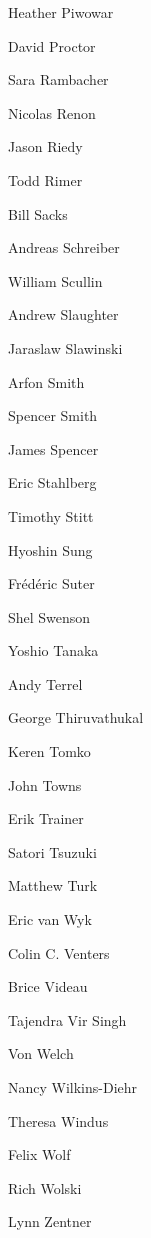 \documentclass[11pt, oneside]{amsart}
\begin{document}
\begin{multicols}{3}
Heather Piwowar

David Proctor

Sara Rambacher

Nicolas Renon

Jason Riedy

Todd Rimer

Bill Sacks

Andreas Schreiber

William Scullin

Andrew Slaughter

Jaraslaw Slawinski

Arfon Smith

Spencer Smith

James Spencer

Eric Stahlberg

Timothy Stitt

Hyoshin Sung

Fr\'{e}d\'{e}ric Suter

Shel Swenson

Yoshio Tanaka

Andy Terrel

George  Thiruvathukal

Keren Tomko

John Towns

Erik Trainer

Satori Tsuzuki

Matthew Turk

Eric van Wyk

Colin C. Venters

Brice Videau

Tajendra Vir Singh

Von Welch

Nancy Wilkins-Diehr

Theresa Windus

Felix Wolf

Rich Wolski

Lynn Zentner

\end{multicols}
\end{document}
